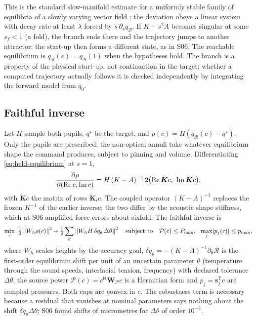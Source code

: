 This is the standard slow-manifold estimate for a uniformly stable family of
equilibria of a slowly varying vector field \cite{fenichel1979}; the deviation obeys a linear system with decay rate at
least $\lambda$ forced by $\dot s\,\partial_s q_{\mathcal B}$. If $K-s^2A$
becomes singular at some $s_f<1$ (a fold), the branch ends there and the
trajectory jumps to another attractor: the start-up then forms a different
state, as in S06. The reachable equilibrium is
$q_{\mathcal R}(c)=q_{\mathcal B}(1)$ when the hypotheses hold. The branch is a
property of the physical start-up, not continuation in the target; whether a
computed trajectory actually follows it is checked independently by
integrating the forward model from $q_0$.

\subsection{Faithful inverse}
Let $H$ sample both pupils, $q^\star$ be the target, and
$\rho(c)=H(q_{\mathcal R}(c)-q^\star)$. Only the pupils are prescribed: the
non-optical annuli take whatever equilibrium shape the command produces,
subject to pinning and volume. Differentiating \cref{eq:held-equilibrium} at
$s=1$,
\begin{equation}
 \frac{\partial\rho}{\partial(\operatorname{Re} c,\operatorname{Im} c)}
 =H\,(K-A)^{-1}\,2\bigl(\operatorname{Re}\tilde{\bm K}c,\ \operatorname{Im}\tilde{\bm K}c\bigr),
 \label{eq:faithful-jacobian}
\end{equation}
with $\tilde{\bm K}c$ the matrix of rows $\tilde{\bm K}_ic$. The coupled
operator $(K-A)^{-1}$ replaces the frozen $K^{-1}$ of the earlier inverse;
the two differ by the acoustic shape stiffness, which at S06 amplified
force errors about sixfold. The faithful inverse is
\begin{equation}
 \min_{c}\ \tfrac12\left\lVert W_h\rho(c)\right\rVert^2
 +\tfrac12\sum_{\theta}\left\lVert W_h H\,\delta q_\theta\,\Delta\theta\right\rVert^2
 \quad\text{subject to}\quad
 \mathcal P(c)\leq P_{\max},\ \ \max_j\lvert p_j(c)\rvert\leq p_{\max},
 \label{eq:faithful-problem}
\end{equation}
where $W_h$ scales heights by the accuracy goal, $\delta q_\theta
=-(K-A)^{-1}\partial_\theta\mathcal R$ is the first-order equilibrium shift per
unit of an uncertain parameter $\theta$ (temperature through the sound speeds,
interfacial tension, frequency) with declared tolerance $\Delta\theta$, the
source power $\mathcal P(c)=c^{\mathsf H}\bm W_{\mathcal P}c$ is a Hermitian
form and $p_j=\bm s_j^{\mathsf T}c$ are sampled pressures. Both caps are
convex in $c$. The robustness term is necessary because a residual that
vanishes at nominal parameters says nothing about the shift
$\delta q_\theta\Delta\theta$; S06 found shifts of micrometres for
$\Delta\theta$ of order $10^{-3}$.

